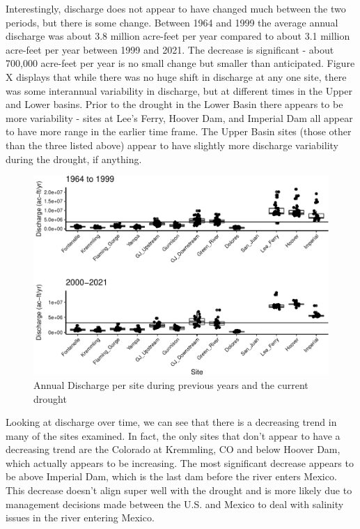 \documentclass[
  12pt,
]{article}
\begin{document}
Interestingly, discharge does not appear to have changed much between
the two periods, but there is some change. Between 1964 and 1999 the
average annual discharge was about 3.8 million acre-feet per year
compared to about 3.1 million acre-feet per year between 1999 and 2021.
The decrease is significant - about 700,000 acre-feet per year is no
small change but smaller than anticipated. Figure X displays that while
there was no huge shift in discharge at any one site, there was some
interannual variability in discharge, but at different times in the
Upper and Lower basins. Prior to the drought in the Lower Basin there
appears to be more variability - sites at Lee's Ferry, Hoover Dam, and
Imperial Dam all appear to have more range in the earlier time frame.
The Upper Basin sites (those other than the three listed above) appear
to have slightly more discharge variability during the drought, if
anything.

\begin{figure}

\includegraphics{WDA_final_project_files/figure-latex/Annual Discharge boxplots-1} \hfill{}

\caption{Annual Discharge per site during previous years and the current drought}\label{fig:Annual Discharge boxplots}
\end{figure}

\newpage

Looking at discharge over time, we can see that there is a decreasing
trend in many of the sites examined. In fact, the only sites that don't
appear to have a decreasing trend are the Colorado at Kremmling, CO and
below Hoover Dam, which actually appears to be increasing. The most
significant decrease appears to be above Imperial Dam, which is the last
dam before the river enters Mexico. This decrease doesn't align super
well with the drought and is more likely due to management decisions
made between the U.S. and Mexico to deal with salinity issues in the
river entering Mexico.
\end{document}

